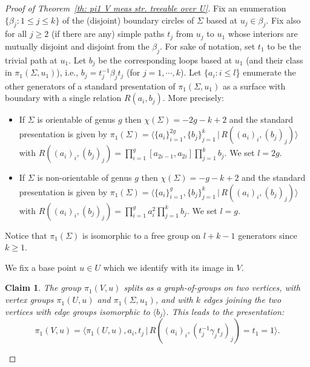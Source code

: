 \documentclass[11pt]{amsart}
\theoremstyle{definition}
\theoremstyle{plain}
\newtheorem*{claim}{Claim}
\newcommand{\<}{\langle}
\renewcommand{\>}{\rangle}
\newcommand{\suchthat}{\colon}
\begin{document}
\begin{proof}[Proof of Theorem~\ref{th: pi1 V meas str. treeable over U}]
Fix an enumeration $\{\beta_j \suchthat 1\leq j \leq k\}$ of  the (disjoint) boundary circles of $\Sigma$ based at $u_j\in \beta_j$.
Fix also for all $j\geq 2$ (if there are any) simple paths $t_j$ from $u_j$ to $u_1$ whose interiors are mutually disjoint and disjoint from the $\beta_j$.
For sake of notation, set $t_1$ to be the trivial path at $u_1$.
Let $b_j$ be the corresponding loops based at $u_1$ (and their class in $\pi_1(\Sigma,u_1)$), i.e.,
 $b_j=t_j^{-1} \beta_j t_j$ (for  $j=1, \cdots, k$).
Let $\{a_i : i \leq l$\} enumerate the other generators of a standard presentation of $\pi_1(\Sigma, u_1)$ as a surface with boundary with a single relation $R(a_i,b_j)$. More precisely:

\begin{itemize}
\item
If $\Sigma$ is orientable of genus $g$ then
 $\chi(\Sigma)=-2g-k+2$ and
the standard presentation is given by
$\pi_1(\Sigma)=\langle \{a_i\}_{i=1}^{2g},\{b_j\}_{j=1}^{k} \,\vert\, R((a_i)_i,(b_j)_j) \rangle$
with $R((a_i)_i,(b_j)_j)=\prod_{i=1}^{g}[a_{2i-1},a_{2i}]\prod_{j=1}^{k} b_j$. We set $l=2g$.

\item
If $\Sigma$ is non-orientable of genus $g$ then
$\chi(\Sigma)=-g-k+2$ and the standard presentation is given by
$ \pi_1(\Sigma)= \langle \{a_i\}_{i=1}^{g},\{b_j\}_{j=1}^{k} \,\vert\, R((a_i)_i,(b_j)_j)\rangle$
with
 $R((a_i)_i,(b_j)_j)=  \prod_{i=1}^{g}a_i^2 \prod_{j=1}^{k} b_j$. We set $l=g$.
\end{itemize}
Notice that $\pi_1(\Sigma)$ is isomorphic to a free group on $l+k-1$ generators since $k\geq 1$.


We fix a base point $u\in U$ which we identify with its image in $V$.
\begin{claim} The group
$\pi_1(V,u)$ splits as a graph-of-groups on two vertices, with vertex groups $\pi_1(U,u)$ and $\pi_1(\Sigma, u_1)$, and with $k$ edges joining the two vertices with edge groups isomorphic to $\langle b_j\rangle$.
This leads to the presentation:
  $$\pi_1(V,u)=\langle \pi_1(U,u), a_i,t_j \,\vert\,  R((a_i)_i,(t_j^{-1}\gamma_j t_j)_j)= t_1=1 \rangle.$$
\end{claim}


\end{proof}
\end{document}
